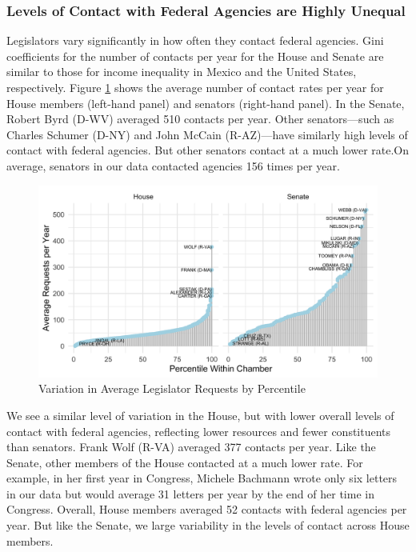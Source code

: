 \documentclass[12pt]{article}
\begin{document}
\subsubsection{Levels of Contact with Federal Agencies are Highly Unequal}
Legislators vary significantly in how often they contact federal agencies. Gini coefficients for the number of contacts per year for the House and Senate are similar to those for income inequality in Mexico and the United States, respectively. Figure \ref{f:contact1} shows the average number of contact rates per year for House members (left-hand panel) and senators (right-hand panel). In the Senate, Robert Byrd (D-WV) averaged 510 contacts per year. Other senators---such as Charles Schumer (D-NY) and John McCain (R-AZ)---have similarly high levels of contact with federal agencies. But other senators contact at a much lower rate.On average, senators in our data contacted agencies 156 times per year.   
 
\begin{figure}
\centering
\caption{Variation in Average Legislator Requests by Percentile} \label{f:contact1} 
\begin{minipage}{\textwidth}
\includegraphics[width = \textwidth]{figs/percentiles-1}
\end{minipage}
\end{figure}


We see a similar level of variation in the House, but with lower overall levels of contact with federal agencies, reflecting lower resources and fewer constituents than senators. Frank Wolf (R-VA) averaged 377 contacts per year. Like the Senate, other members of the House contacted at a much lower rate. For example, in her first year in Congress,  Michele Bachmann wrote only six letters in our data but would average 31 letters per year by the end of her time in Congress. Overall, House members averaged 52 contacts with federal agencies per year. But like the Senate, we large variability in the levels of contact across House members.  
\end{document}
